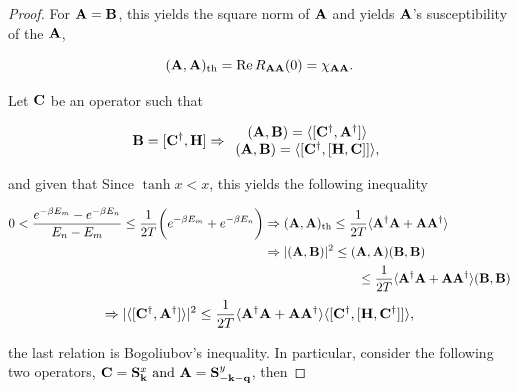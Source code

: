 \documentclass{homework}
\begin{document}
\begin{proof}
For ${\bf A} = {\bf B}$, this yields the square norm of ${\bf A}$ and yields ${\bf A}$'s susceptibility of the ${\bf A}$,

$$
    ( {\bf A}, {\bf A} )_{\textnormal{th}} = \Re R_{{\bf A}{\bf A}}(0) = \chi_{{\bf A} {\bf A}}.
$$

Let ${\bf C}$ be an operator such that 

\begin{equation}
    {\bf B} = [{\bf C}^\dagger, {\bf H}] \Rightarrow \begin{array}{c}
         ({\bf A}, {\bf B}) = \langle [{\bf C}^\dagger, {\bf A}^\dagger] \rangle  \\
         ({\bf A}, {\bf B}) = \langle [{\bf C}^\dagger, [{\bf H}, {\bf C}]] \rangle,
    \end{array}
\end{equation}

and given that Since $\tanh x < x$, this yields the following inequality 

\begin{align*}%
   0 < \frac{e^{-\beta E_m} - e^{-\beta E_n}}{E_n - E_m} \leq \frac{1}{2T} \bigg(e^{-\beta E_m} + e^{-\beta E_n} \bigg) &\Rightarrow ( {\bf A}, {\bf A} )_{\textnormal{th}} \leq \frac{1}{2T} \langle {\bf A}^\dagger {\bf A} + {\bf A} {\bf A}^\dagger \rangle \\
    &\Rightarrow |({\bf A}, {\bf B})|^2 \leq ({\bf A}, {\bf A})({\bf B}, {\bf B}) \\
        & \blanky \blanky \blanky \blanky \blanky \blanky \blanky \blanky \blanky \blanky \blanky \blanky \blanky \blanky \blanky \blanky \blanky \blanky \blanky \blanky \blanky \blanky \leq \frac{1}{2T} \langle {\bf A}^\dagger  {\bf A} + {\bf A} {\bf A}^\dagger \rangle ({\bf B}, {\bf B}) \\
\end{align*}
\begin{equation}
    \label{Pre_Bogoliubov_ineq}
    \Rightarrow |\langle [{\bf C}^\dagger, {\bf A}^\dagger] \rangle|^2 \leq \frac{1}{2T} \langle {\bf A}^\dagger {\bf A} + {\bf A} {\bf A}^\dagger \rangle \langle [{\bf C}^\dagger, [{\bf H}, {\bf C}^\dagger]] \rangle,
\end{equation}

the last relation is Bogoliubov's inequality. In particular, consider the following two operators, $
    {\bf C} = {\bf S}^x_{{\bf k}} \textnormal{ and } {\bf A} = {\bf S}_{{\bf -k-q}}^y$,
then


\end{proof}
\end{document}
